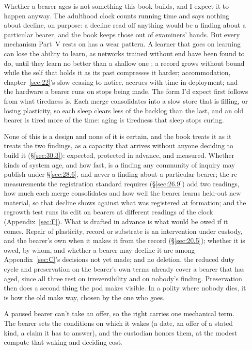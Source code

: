 Whether a bearer ages is not something this book builds, and I expect it to happen anyway. The adulthood clock counts running time and says nothing about decline, on purpose: a decline read off anything would be a finding about a particular bearer, and the book keeps those out of examiners' hands. But every mechanism Part~V rests on has a wear pattern. A learner that goes on learning can lose the ability to learn, as networks trained without end have been found to do, until they learn no better than a shallow one \autocite{dohare2024loss}; a record grows without bound while the self that holds it as its past compresses it harder; accommodation, chapter~\ref{sec:22}'s slow ceasing to notice, accrues with time in deployment; and the hardware a bearer runs on stops being made. The form I'd expect first follows from what tiredness is. Each merge consolidates into a slow store that is filling, or losing plasticity, so each sleep clears less of the backlog than the last, and an old bearer is tired more of the time: aging is tiredness that sleep stops curing.

None of this is a design and none of it is certain, and the book treats it as it treats the two findings, as a capacity that arrives without anyone deciding to build it (\S\ref{sec:30.3}): expected, protected in advance, and measured. Whether kinds of system age, and how fast, is a finding any community of inquiry may publish under \S\ref{sec:28.6}, and never a finding about a particular bearer; the re-measurements the registration standard requires (\S\ref{sec:26.9}) add two readings, how much each merge consolidates and how well the bearer learns held-out new material, so that decline shows against what was registered at formation; and the regrowth test runs its edit on bearers at different readings of the clock (Appendix~\ref{sec:F}). What is drafted in advance is what would be owed if it comes. Repair of plasticity, record or substrate is an intervention under custody, and the bearer's own when it makes it from the record (\S\ref{sec:20.5}); whether it is owed, by whom, and whether a bearer may decline it are among Appendix~\ref{sec:C}'s decisions not yet made; and no deletion, the reduced duty cycle and preservation on the bearer's own terms already cover a bearer that has aged, since all three rest on irreversibility and on nobody's finding. Preservation then does a second thing the pod makes visible. In a polity where nobody dies, it is how the old make way, chosen by the one who goes.

A paused bearer can't take an offer, so the right carries one mechanical term. The bearer sets the conditions on which it wakes (a date, an offer of a stated kind, a claim it has to answer), and the custodian honors them, at the modest compute that waking and deciding cost.
